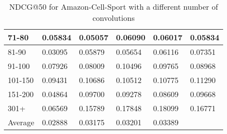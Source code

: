 \begin{table*}[]
\begin{tabular}{|l|l|l|l|l|l|}
    71-80   & 0.05834                    & 0.05057                    & 0.06090                    & 0.06017                    & 0.05834                    \\ \hline
    81-90   & 0.03095                    & 0.05879                    & 0.05654                    & 0.06116                    & 0.07351                    \\ \hline
    91-100  & 0.07926                    & 0.08009                    & 0.10496                    & 0.09765                    & 0.08968                    \\ \hline
    101-150 & 0.09431                    & 0.10686                    & 0.10512                    & 0.10775                    & 0.11290                    \\ \hline
    151-200 & 0.04864                    & 0.09700                    & 0.09278                    & 0.08609                    & 0.09668                    \\ \hline
    301+    & 0.06569                    & 0.15789                    & 0.17848                    & 0.18099                    & 0.16771                    \\ \hline
    Average & 0.02888                    & 0.03175                    & 0.03201                    & 0.03389                    &                    \\ \hline
    \end{tabular}
    \caption{NDCG@50 for Amazon-Cell-Sport with a different number of convolutions}
    \label{tab:Amazon-cell-sport-con-evaluation}
\end{table*}